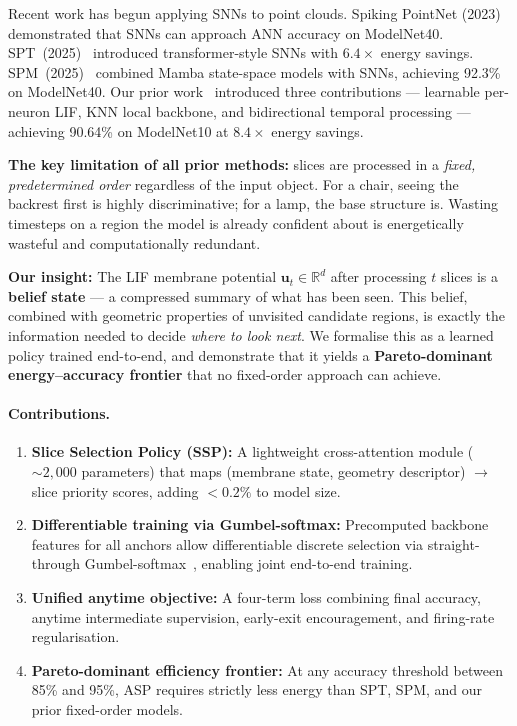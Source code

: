 \documentclass[11pt,a4paper]{article}
\begin{document}
Recent work has begun applying SNNs to point clouds. Spiking PointNet
(2023)~\cite{spiking_ptnet} demonstrated that SNNs can approach ANN accuracy on
ModelNet40. SPT~(2025)~\cite{spt} introduced transformer-style SNNs with
$6.4\times$ energy savings. SPM~(2025)~\cite{spm2025} combined Mamba
state-space models with SNNs, achieving 92.3\% on ModelNet40. Our prior
work~\cite{purdue2026} introduced three contributions --- learnable per-neuron
LIF, KNN local backbone, and bidirectional temporal processing --- achieving
90.64\% on ModelNet10 at $8.4\times$ energy savings.

\textbf{The key limitation of all prior methods:} slices are processed in a
\emph{fixed, predetermined order} regardless of the input object. For a chair,
seeing the backrest first is highly discriminative; for a lamp, the base
structure is. Wasting timesteps on a region the model is already confident about
is energetically wasteful and computationally redundant.

\textbf{Our insight:} The LIF membrane potential $\mathbf{u}_t \in \mathbb{R}^d$
after processing $t$ slices is a \textbf{belief state} --- a compressed summary
of what has been seen. This belief, combined with geometric properties of
unvisited candidate regions, is exactly the information needed to decide
\emph{where to look next}. We formalise this as a learned policy trained
end-to-end, and demonstrate that it yields a \textbf{Pareto-dominant
energy--accuracy frontier} that no fixed-order approach can achieve.

\paragraph{Contributions.}
\begin{enumerate}
  \item \textbf{Slice Selection Policy (SSP):} A lightweight cross-attention
    module (${\sim}2{,}000$ parameters) that maps (membrane state, geometry
    descriptor) $\to$ slice priority scores, adding ${<}0.2\%$ to model size.
  \item \textbf{Differentiable training via Gumbel-softmax:} Precomputed backbone
    features for all anchors allow differentiable discrete selection via
    straight-through Gumbel-softmax~\cite{gumbel}, enabling joint end-to-end
    training.
  \item \textbf{Unified anytime objective:} A four-term loss combining final
    accuracy, anytime intermediate supervision, early-exit encouragement, and
    firing-rate regularisation.
  \item \textbf{Pareto-dominant efficiency frontier:} At any accuracy threshold
    between 85\% and 95\%, ASP requires strictly less energy than SPT, SPM, and
    our prior fixed-order models.
\end{enumerate}
\end{document}
